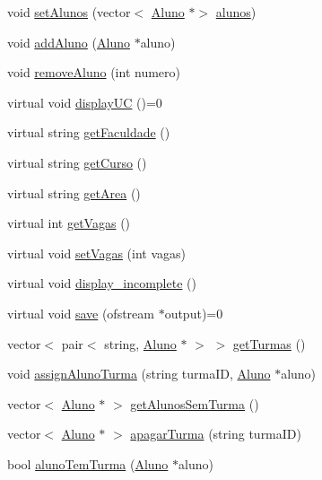 \begin{DoxyCompactItemize}
\item 
void \hyperlink{class_uc_a1bddbeaf97c10e45e2587b1c378f8be6}{set\+Alunos} (vector$<$ \hyperlink{class_aluno}{Aluno} $\ast$$>$ \hyperlink{class_uc_a058e545b7e0dbbf16f6af64bb47361eb}{alunos})
\item 
void \hyperlink{class_uc_a89ed45830454cdf2f4a7528237db2c7d}{add\+Aluno} (\hyperlink{class_aluno}{Aluno} $\ast$aluno)
\item 
void \hyperlink{class_uc_a528b6f919358f6ab1ffaf6f6542343b3}{remove\+Aluno} (int numero)
\item 
virtual void \hyperlink{class_uc_a9a64416600c67469a285d97a20050dd4}{display\+UC} ()=0
\item 
virtual string \hyperlink{class_uc_a5820a4fc8672679329f72467aa1599da}{get\+Faculdade} ()
\item 
virtual string \hyperlink{class_uc_a30c8b684d775a3d8304fcafefea2b951}{get\+Curso} ()
\item 
virtual string \hyperlink{class_uc_a98e8e68278a1cfb628662ab3d613410f}{get\+Area} ()
\item 
virtual int \hyperlink{class_uc_aabb7272709731972c4bc574cfde28772}{get\+Vagas} ()
\item 
virtual void \hyperlink{class_uc_a41b665e518e252eead3d8425696cddf3}{set\+Vagas} (int vagas)
\item 
virtual void \hyperlink{class_uc_a32e7d62a706731268ef22f5d0c76793f}{display\+\_\+incomplete} ()
\item 
virtual void \hyperlink{class_uc_a6d5fafb63b88b75408dab0911276ce3f}{save} (ofstream $\ast$output)=0
\item 
vector$<$ pair$<$ string, \hyperlink{class_aluno}{Aluno} $\ast$ $>$ $>$ \hyperlink{class_uc_ac2a824827d686ee674bb8c2e9af70882}{get\+Turmas} ()
\item 
void \hyperlink{class_uc_a02b0eae5f450580e7d20cb8c10205c3a}{assign\+Aluno\+Turma} (string turma\+ID, \hyperlink{class_aluno}{Aluno} $\ast$aluno)
\item 
vector$<$ \hyperlink{class_aluno}{Aluno} $\ast$ $>$ \hyperlink{class_uc_a2b4ec2b2eee6d846de5553d02f75e062}{get\+Alunos\+Sem\+Turma} ()
\item 
vector$<$ \hyperlink{class_aluno}{Aluno} $\ast$ $>$ \hyperlink{class_uc_acab5ac7d43c6733925b4a0127b41a5cf}{apagar\+Turma} (string turma\+ID)
\item 
bool \hyperlink{class_uc_a1c290a83c5948f6f494e28d21d4c3e2c}{aluno\+Tem\+Turma} (\hyperlink{class_aluno}{Aluno} $\ast$aluno)
\end{DoxyCompactItemize}
